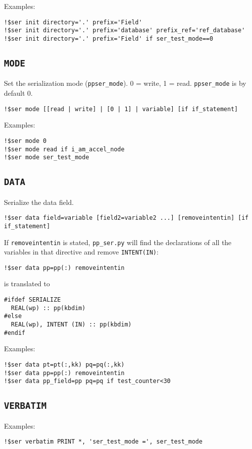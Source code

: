\documentclass{article}
\newcommand{\ppser}{\texttt{pp\_ser.py}}
\begin{document}
Examples:
\begin{lstlisting}
!$ser init directory='.' prefix='Field'
!$ser init directory='.' prefix='database' prefix_ref='ref_database'
!$ser init directory='.' prefix='Field' if ser_test_mode==0
\end{lstlisting}

\subsection{\texttt{MODE}}
Set the serialization mode (\texttt{ppser\_mode}). 0 = write, 1 = read. \texttt{ppser\_mode} is by default 0.

\begin{lstlisting}
!$ser mode [[read | write] | [0 | 1] | variable] [if if_statement]
\end{lstlisting}

Examples:
\begin{lstlisting}
!$ser mode 0
!$ser mode read if i_am_accel_node
!$ser mode ser_test_mode
\end{lstlisting}

\subsection{\texttt{DATA}}
Serialize the data field.

\begin{lstlisting}
!$ser data field=variable [field2=variable2 ...] [removeintentin] [if if_statement]
\end{lstlisting}

If \texttt{removeintentin} is stated, \ppser{} will find the declarations of all the variables in that directive and remove \texttt{INTENT(IN)}:
\begin{lstlisting}
!$ser data pp=pp(:) removeintentin
\end{lstlisting}
is translated to
\begin{lstlisting}
#ifdef SERIALIZE
  REAL(wp) :: pp(kbdim)
#else
  REAL(wp), INTENT (IN) :: pp(kbdim)
#endif
\end{lstlisting}

Examples:
\begin{lstlisting}
!$ser data pt=pt(:,kk) pq=pq(:,kk)
!$ser data pp=pp(:) removeintentin
!$ser data pp_field=pp pq=pq if test_counter<30
\end{lstlisting}

\subsection{\texttt{VERBATIM}}
Examples:
\begin{lstlisting}
!$ser verbatim PRINT *, 'ser_test_mode =', ser_test_mode
\end{lstlisting}
\end{document}

